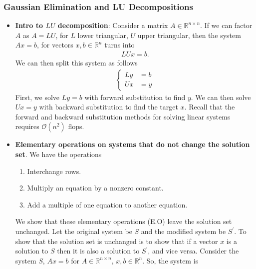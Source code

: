 \documentclass{report}
\begin{document}
    \subsubsection{Gaussian Elimination and LU Decompositions}
    \begin{itemize}
        \item \textbf{Intro to $LU$ decomposition}: Consider a matrix $A \in \mathbb{R}^{n\times n} $. If we can factor $A$ as $A = LU$, for $L$ lower triangular, $U$ upper triangular, then the system $Ax = b$, for vectors $x,b \in \mathbb{R}^{n}$ turns into
            \begin{align*}
                LUx = b
            .\end{align*}
            We can then split this system as follows
            \begin{align*}
                \begin{cases}
                    Ly &= b \\
                    Ux &= y
                \end{cases}
            \end{align*}
            First, we solve $Ly = b$ with forward substitution to find $y$. We can then solve $Ux = y$ with backward substitution to find the target $x$.
            \bigbreak \noindent 
            Recall that the forward and backward substitution methods for solving linear systems requires $\mathcal{O}(n^{2})$ flops.
        \item \textbf{Elementary operations on systems that do not change the solution set}. We have the operations
            \begin{enumerate}
                \item Interchange rows.
                \item Multiply an equation by a nonzero constant.
                \item Add a multiple of one equation to another equation.
            \end{enumerate}
            We show that these elementary operations (E.O) leave the solution set unchanged. Let the original system be $S$ and the modified system be $S^{\prime}$. To show that the solution set is unchanged is to show that if a vector $x$ is a solution to $S$ then it is also a solution to $S^{\prime}$, and vice versa.
            \bigbreak \noindent 
            Consider the system $S$, $Ax = b$ for $A \in \mathbb{R}^{n\times n}$, $x,b \in \mathbb{R}^{n}$. So, the system is
            \begin{align*}

\end{align*}
\end{itemize}
\end{document}
